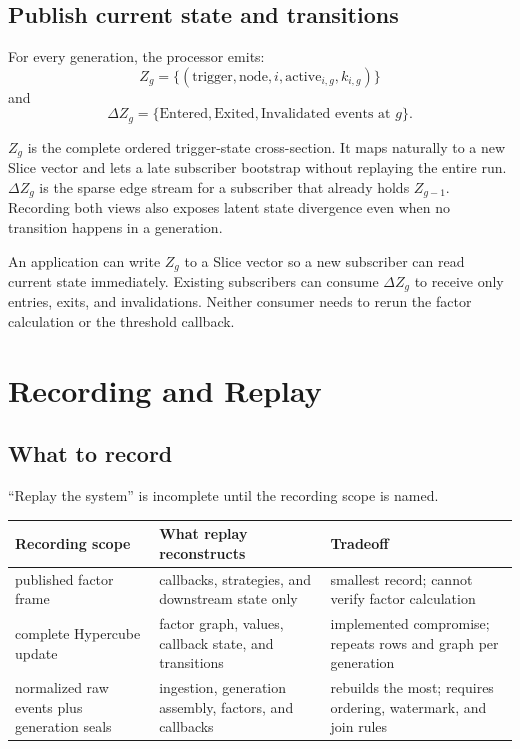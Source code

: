 \documentclass{strategynet-journal}
\newcommand{\SLICE}{\textsf{Slice}}
\begin{document}
\subsection{Publish current state and transitions}

For every generation, the processor emits:
\[
  Z_g=\{(\mathrm{trigger},\mathrm{node},i,
          \mathrm{active}_{i,g},k_{i,g})\}
\]
and
\[
  \Delta Z_g=\{\mathrm{Entered},\mathrm{Exited},
                \mathrm{Invalidated}\text{ events at }g\}.
\]

\(Z_g\) is the complete ordered trigger-state cross-section.  It maps
naturally to a new \SLICE{} vector and lets a late subscriber bootstrap without
replaying the entire run.  \(\Delta Z_g\) is the sparse edge stream for a
subscriber that already holds \(Z_{g-1}\).  Recording both views also exposes
latent state divergence even when no transition happens in a generation.

An application can write \(Z_g\) to a \SLICE{} vector so a new subscriber can
read current state immediately.  Existing subscribers can consume
\(\Delta Z_g\) to receive only entries, exits, and invalidations.  Neither
consumer needs to rerun the factor calculation or the threshold callback.

\section{Recording and Replay}

\subsection{What to record}

``Replay the system'' is incomplete until the recording scope is named.
\begin{center}
\begin{tabularx}{\textwidth}{@{}p{}p{}X@{}}
\toprule
Recording scope & What replay reconstructs & Tradeoff \\
\midrule
published factor frame &
callbacks, strategies, and downstream state only &
smallest record; cannot verify factor calculation \\
complete Hypercube update &
factor graph, values, callback state, and transitions &
implemented compromise; repeats rows and graph per generation \\
normalized raw events plus generation seals &
ingestion, generation assembly, factors, and callbacks &
rebuilds the most; requires ordering, watermark, and join rules \\
\bottomrule
\end{tabularx}
\end{center}
\end{document}
